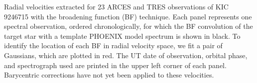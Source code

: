 \label{fig:bffig} Radial velocities extracted for 23 ARCES and TRES observations of KIC 9246715 with the broadening function (BF) technique. Each panel represents one spectral observation, ordered chronologically, for which the BF convolution of the target star with a template PHOENIX model spectrum is shown in black. To identify the location of each BF in radial velocity space, we fit a pair of Gaussians, which are plotted in red. The UT date of observation, orbital phase, and spectrograph used are printed in the upper left corner of each panel. Barycentric corrections have not yet been applied to these velocities.